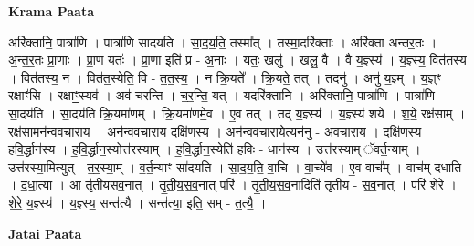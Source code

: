 \documentclass[17pt]{extarticle}
\begin{document}
\textbf{Krama Paata} \newline

अरि॑क्तानि॒ पात्रा॑णि । पात्रा॑णि सादयति । सा॒द॒य॒ति॒ तस्मा᳚त् । तस्मा॒दरि॑क्ताः । अरि॑क्ता अन्तर॒तः । अ॒न्त॒र॒तः प्रा॒णाः । प्रा॒ण यतः॑ । प्रा॒णा इति॑ प्र - अ॒नाः । यतः॒ खलु॑ । खलु॒ वै । वै य॒ज्ञ्स्य॑ । य॒ज्ञ्स्य॒ वित॑तस्य । वित॑तस्य॒ न । वित॑त॒स्येति॒ वि - त॒त॒स्य॒ । न क्रि॒यते᳚ । क्रि॒यते॒ तत् । तदनु॑ । अनु॑ य॒ज्ञ्म् । य॒ज्ञ्ꣳ रक्षाꣳ॑सि । रक्षाꣳ॒॒स्यव॑ । अव॑ चरन्ति । च॒र॒न्ति॒ यत् । यदरि॑क्तानि । अरि॑क्तानि॒ पात्रा॑णि । पात्रा॑णि सा॒दय॑ति । सा॒दय॑ति क्रि॒यमा॑णम् । क्रि॒यमा॑णमे॒व । ए॒व तत् । तद् य॒ज्ञ्स्य॑ । य॒ज्ञ्स्य॑ शये । श॒ये॒ रक्ष॑साम् । रक्ष॑सा॒मन॑न्ववचाराय । अन॑न्ववचाराय॒ दक्षि॑णस्य । अन॑न्ववचारा॒येत्यन॑नु - अ॒व॒चा॒रा॒य॒ । दक्षि॑णस्य हवि॒र्द्धान॑स्य । ह॒वि॒र्द्धान॒स्योत्त॑रस्याम् । ह॒वि॒र्द्धान॒स्येति॑ हविः - धान॑स्य । उत्त॑रस्याम् ॅवर्त॒न्याम् । उत्त॑रस्या॒मित्युत् - त॒र॒स्या॒म् । व॒र्त॒न्याꣳ सा॑दयति । सा॒द॒य॒ति॒ वा॒चि । वा॒च्ये॑व । ए॒व वाच᳚म् । वाच॑म् दधाति । द॒धा॒त्या । आ तृ॑तीयसव॒नात् । तृ॒ती॒य॒स॒व॒नात् परि॑ । तृ॒ती॒य॒स॒व॒नादिति॑ तृतीय - स॒व॒नात् । परि॑ शेरे । शे॒रे॒ य॒ज्ञ्स्य॑ । य॒ज्ञ्स्य॒ सन्त॑त्यै । सन्त॑त्या॒ इति॒ सम् - त॒त्यै॒ । \newline

\textbf{Jatai Paata} \newline
\end{document}
